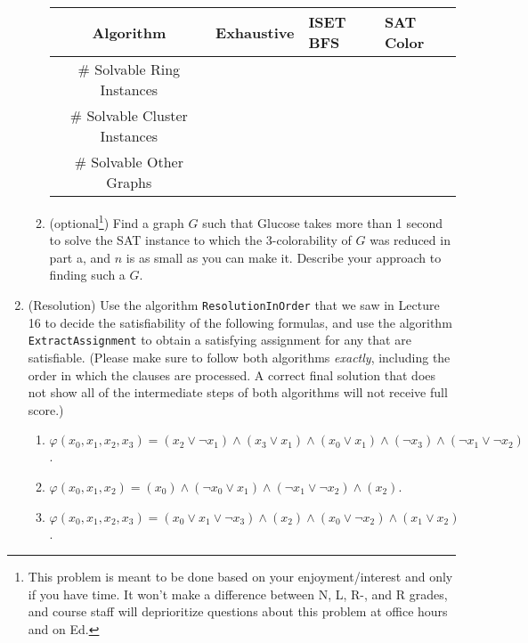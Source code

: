 \documentclass[11pt]{article}
\begin{document}
\begin{enumerate}
\begin{enumerate}
\begin{center}
    \begin{tabular}{|c|l|l|l|}
    \hline 
    Algorithm
    & \multicolumn{1}{|p{2cm}|}{Exhaustive}
    & \multicolumn{1}{|p{2cm}|}{ISET BFS}
    & \multicolumn{1}{|p{2cm}|}{SAT Color}\\\hline
    \hline
        \# Solvable Ring Instances &  &  & \\
        \# Solvable Cluster Instances  &   & &  \\
        \# Solvable Other Graphs  &   & &  \\
        \hline
    \end{tabular}
\end{center}

    \item (optional\footnote{This problem is meant to be done based on your enjoyment/interest and only if you have time. It won't make a difference between N, L, R-, and R grades, and course staff will deprioritize questions about this problem at office hours and on Ed.}) Find a graph $G$ such that Glucose takes more than 1 second to solve the SAT instance to which the 3-colorability of $G$ was reduced in part a, and $n$ is as small as you can make it. Describe your approach to finding such a $G$. 
  \end{enumerate}

\item (Resolution) Use the algorithm \texttt{ResolutionInOrder} that we saw in Lecture 16 to decide the satisfiability of the following formulas, and use the algorithm \texttt{ExtractAssignment} to obtain a satisfying assignment for any that are satisfiable. (Please make sure to follow both algorithms \textit{exactly}, including the order in which the clauses are processed. A correct final solution that does not show all of the intermediate steps of both algorithms will not receive full score.)
  
  \begin{enumerate}
      \item $\varphi(x_0, x_1, x_2, x_3) = (x_2 \vee \neg x_1) \wedge (x_3 \vee x_1) \wedge (x_0 \vee x_1) \wedge (\neg x_3) \wedge (\neg x_1 \vee \neg x_2)$.

      \item $\varphi(x_0, x_1, x_2) = (x_0) \wedge (\neg x_0 \vee x_1) \wedge (\neg x_1 \vee \neg x_2) \wedge (x_2)$.
      
      \item $\varphi(x_0, x_1, x_2, x_3) = (x_0 \vee x_1 \vee \neg x_3) \wedge (x_2) \wedge (x_0 \vee \neg x_2) \wedge (x_1 \vee x_2)$.


\end{enumerate}
\end{enumerate}
\end{document}
